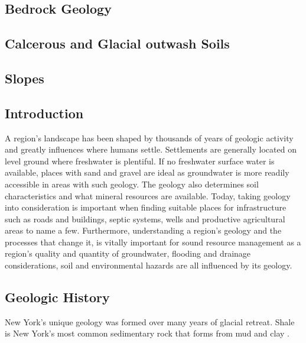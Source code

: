 


\subsection{Bedrock Geology}

\subsection{Calcerous and Glacial outwash Soils}
\subsection{Slopes}

\subsection{Introduction}
A region's landscape has been shaped by thousands of years of geologic activity and greatly influences where humans settle. Settlements are generally located on level ground where freshwater is plentiful. If no freshwater surface water is available, places with sand and gravel are ideal as groundwater is more readily accessible in areas with such geology. The geology also determines soil characteristics and what mineral resources are available. Today, taking geology into consideration is important when finding suitable places for infrastructure such as roads and buildings, septic systems, wells and productive agricultural areas to name a few. Furthermore, understanding a region's geology and the processes that change it, is vitally important for sound resource management as a region's quality and quantity of groundwater, flooding and drainage considerations, soil and environmental hazards are all influenced by its geology.

\subsection{Geologic History}
New York's unique geology was formed over many years of glacial retreat. Shale is New York's most common sedimentary rock that forms from mud and clay \cite{vandiver}.

